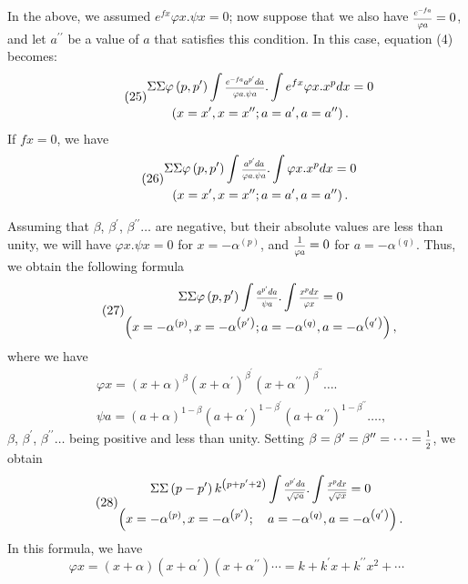 \documentclass[oneside, 12 pt, leqno]{memoir}
\let\oldfrac\frac
\def\frac#1#2{\mathchoice{\text{\scalebox{.83}{${\oldfrac{#1}{#2}}$}}}{\text{\scalebox{.83}{${\displaystyle\oldfrac{#1}{#2}}$}}}{\genfrac{}{}{}{2}{#1}{#2}}{\genfrac{}{}{}{3}{#1}{#2}}}
\begin{document}
In the above, we assumed \(e^{f x} \varphi x. \psi x=0\); now suppose that we also have \(\frac{e^{-f a}}{\varphi a}=0\), and let \(a^{\prime \prime}\) be a value of \(a\) that satisfies this condition. In this case, equation (4) becomes:
\[\tag{25}\begin{gathered}
\Sigma \Sigma \varphi\left(p, p^{\prime}\right) \int \frac{e^{-f a} a^{p^{\prime}} d a}{\varphi a. \psi a}. \int e^{f x} \varphi x. x^p d x=0 \\
\left(x=x^{\prime}, x=x^{\prime \prime} ;  a=a^{\prime}, a=a^{\prime \prime}\right).
\end{gathered}\]
If \(f x=0\), we have
\[\tag{26}\begin{gathered}
\Sigma \Sigma \varphi\left(p, p^{\prime}\right) \int \frac{a^{p^{\prime}} d a}{\varphi a. \psi a}. \int \varphi x. x^p d x=0 \\
\left(x=x^{\prime}, x=x^{\prime \prime} ; a=a^{\prime}, a=a^{\prime \prime}\right).
\end{gathered}\]

Assuming that \(\beta\), \(\beta^{\prime}\), \(\beta^{\prime \prime} \ldots\) are negative, but their absolute values are less than unity, we will have \(\varphi x. \psi x=0\) for \(x=-\alpha^{(p)}\), and \(\frac{1}{\varphi a}=0\) for \(a=-\alpha^{(q)}\). Thus, we obtain the following formula
\[\tag{27}\begin{gathered}
\Sigma \Sigma \varphi\left(p, p^{\prime}\right) \int \frac{a^{p^{\prime}} d a}{\psi a}. \int \frac{x^p d x}{\varphi x}=0 \\
\left(x=-\alpha^{(p)}, x=-\alpha^{\left(p^{\prime}\right)} ; a=-\alpha^{(q)}, a=-\alpha^{\left(q^{\prime}\right)}\right),
\end{gathered}\]
where we have
\[\begin{aligned}
& \varphi x=(x+\alpha)^\beta\left(x+\alpha^{\prime}\right)^{\beta^{\prime}}\left(x+\alpha^{\prime \prime}\right)^{\beta^{\prime \prime}} \ldots. \\
& \psi a=(a+\alpha)^{1-\beta} (a+\alpha^{\prime})^{1-\beta^{\prime}}(a+\alpha^{\prime \prime})^{1-\beta^{\prime \prime}} \ldots.,
\end{aligned}\]
\(\beta\), \(\beta^{\prime}\), \(\beta^{\prime \prime} \ldots\) being positive and less than unity.
Setting \(\beta=\beta^{\prime}=\beta^{\prime \prime}=\cdots=\frac{1}{2}\), we obtain
\[\tag{28}
\begin{gathered}
\Sigma \Sigma\left(p-p^{\prime}\right) k^{\left(p+p^{\prime}+2\right)} \int \frac{a^{p^{\prime}} d a}{\sqrt{\varphi a}}. \int \frac{x^p d x}{\sqrt{\varphi x}}=0 \\
\left(x=-\alpha^{(p)}, x=-\alpha^{\left(p^{\prime}\right)} ; \quad a=-\alpha^{(q)}, a=-\alpha^{\left(q^{\prime}\right)}\right).
\end{gathered}\]
In this formula, we have
\[\varphi x=(x+\alpha)\left(x+\alpha^{\prime}\right)\left(x+\alpha^{\prime \prime}\right) \cdots=k+k^{\prime} x+k^{\prime \prime} x^2+\cdots\]
\end{document}
